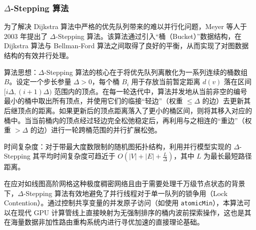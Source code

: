 
\subsubsection{\texorpdfstring{$\Delta$}{Delta}-Stepping 算法}

为了解决 Dijkstra 算法中严格的优先队列带来的难以并行化问题，Meyer 等人于 2003 年提出了 $\Delta$-Stepping 算法。该算法通过引入“桶（Bucket）”数据结构，在 Dijkstra 算法与 Bellman-Ford 算法之间取得了良好的平衡，从而实现了对图数据结构的有效并行处理。

算法思想：$\Delta$-Stepping 算法的核心在于将优先队列离散化为一系列连续的桶数组 $B$。设定一个步长参量 $\Delta > 0$，每个桶 $B_i$ 用于存放当前暂定距离 $d(v)$ 落在区间 $[i\Delta, (i+1)\Delta)$ 范围内的顶点。在每一轮迭代中，算法并发地从当前非空的编号最小的桶中取出所有顶点，并使用它们的临接“轻边”（权重 $\le \Delta$ 的边）去更新其后继顶点的距离。如果更新后的顶点距离落入了更小的桶区间，则将其移入对应的桶中。当当前桶内的顶点经过轻边完全松弛稳定后，再利用与之相连的“重边”（权重 $> \Delta$ 的边）进行一轮跨桶范围的并行扩展松弛。

时间复杂度：对于带最大度数限制的随机图拓扑结构，利用并行模型实现的 $\Delta$-Stepping 其平均时间复杂度可趋近于 $O(|V| + |E| + \frac{L}{\Delta})$，其中 $L$ 为最长最短路径距离。

在应对如线图高阶网格这种极度稠密网络且由于需要处理千万级节点状态的背景下，$\Delta$-Stepping 算法有效地避免了并行线程对于单一队列的锁争用（Lock Contention）。通过控制共享变量的并发原子访问（如使用 \texttt{atomicMin}），本算法可以在现代 GPU 计算管线上直接映射为无强制排序的桶内波前探索操作，这也是其在海量数据非加性路由重构系统内进行寻优加速的直接理论基础。

